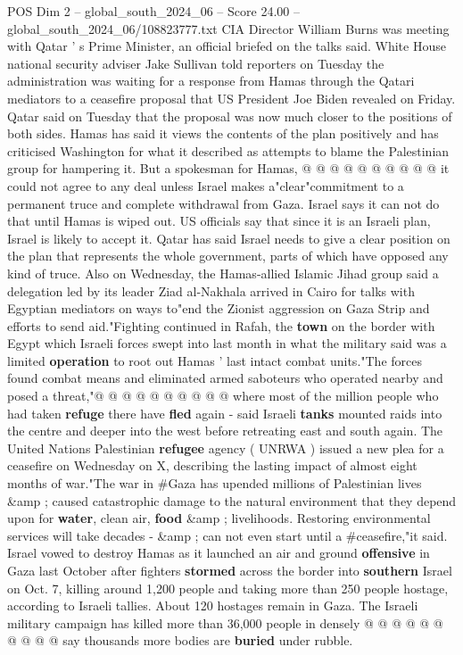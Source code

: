 \begin{textsample}{POS Dim 2 – global\_south\_2024\_06 – Score 24.00 – global\_south\_2024\_06/108823777.txt}
CIA Director William Burns was meeting with Qatar ' s Prime Minister, an official briefed on the talks said.
White House national security adviser Jake Sullivan told reporters on Tuesday the administration was waiting for a response from Hamas through the Qatari mediators to a ceasefire proposal that US President Joe Biden revealed on Friday.
Qatar said on Tuesday that the proposal was now much closer to the positions of both sides.
Hamas has said it views the contents of the plan positively and has criticised Washington for what it described as attempts to blame the Palestinian group for hampering it.
But a spokesman for Hamas, @ @ @ @ @ @ @ @ @ @ it could not agree to any deal unless Israel makes a"clear"commitment to a permanent truce and complete withdrawal from Gaza.
Israel says it can not do that until Hamas is wiped out.
US officials say that since it is an Israeli plan, Israel is likely to accept it.
Qatar has said Israel needs to give a clear position on the plan that represents the whole government, parts of which have opposed any kind of truce.
Also on Wednesday, the Hamas-allied Islamic Jihad group said a delegation led by its leader Ziad al-Nakhala arrived in Cairo for talks with Egyptian mediators on ways to"end the Zionist aggression on Gaza Strip and efforts to send aid."Fighting continued in Rafah, the \textbf{town} on the border with Egypt which Israeli forces swept into last month in what the military said was a limited \textbf{operation} to root out Hamas ' last intact combat units."The forces found combat means and eliminated armed saboteurs who operated nearby and posed a threat,"@ @ @ @ @ @ @ @ @ @ where most of the million people who had taken \textbf{refuge} there have \textbf{fled} again - said Israeli \textbf{tanks} mounted raids into the centre and deeper into the west before retreating east and south again.
The United Nations Palestinian \textbf{refugee} agency ( UNRWA ) issued a new plea for a ceasefire on Wednesday on X, describing the lasting impact of almost eight months of war."The war in \#Gaza has upended millions of Palestinian lives \&amp ; caused catastrophic damage to the natural environment that they depend upon for \textbf{water}, clean air, \textbf{food} \&amp ; livelihoods.
Restoring environmental services will take decades - \&amp ; can not even start until a \#ceasefire,"it said.
Israel vowed to destroy Hamas as it launched an air and ground \textbf{offensive} in Gaza last October after fighters \textbf{stormed} across the border into \textbf{southern} Israel on Oct. 7, killing around 1,200 people and taking more than 250 people hostage, according to Israeli tallies.
About 120 hostages remain in Gaza.
The Israeli military campaign has killed more than 36,000 people in densely @ @ @ @ @ @ @ @ @ @ say thousands more bodies are \textbf{buried} under rubble.

\end{textsample}
